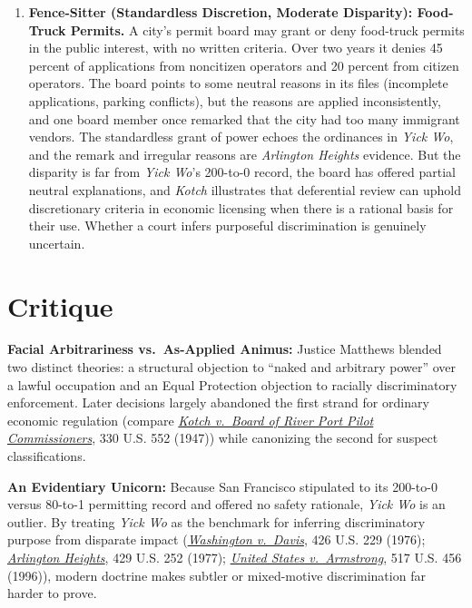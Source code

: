 \documentclass[12pt]{article}
\begin{document}
\begin{enumerate}
\item \textbf{Fence-Sitter (Standardless Discretion, Moderate Disparity): Food-Truck Permits.} A city's permit board may grant or deny food-truck permits in the public interest, with no written criteria. Over two years it denies 45 percent of applications from noncitizen operators and 20 percent from citizen operators. The board points to some neutral reasons in its files (incomplete applications, parking conflicts), but the reasons are applied inconsistently, and one board member once remarked that the city had too many immigrant vendors. The standardless grant of power echoes the ordinances in \textit{Yick Wo}, and the remark and irregular reasons are \textit{Arlington Heights} evidence. But the disparity is far from \textit{Yick Wo}'s 200-to-0 record, the board has offered partial neutral explanations, and \textit{Kotch} illustrates that deferential review can uphold discretionary criteria in economic licensing when there is a rational basis for their use. Whether a court infers purposeful discrimination is genuinely uncertain.

\end{enumerate}

\section{Critique}
\textbf{Facial Arbitrariness vs.\ As-Applied Animus:} Justice Matthews blended two distinct theories: a structural objection to ``naked and arbitrary power'' over a lawful occupation and an Equal Protection objection to racially discriminatory enforcement. Later decisions largely abandoned the first strand for ordinary economic regulation (compare \href{https://supreme.justia.com/cases/federal/us/330/552/}{\emph{Kotch v.\ Board of River Port Pilot Commissioners}}, 330 U.S. 552 (1947)) while canonizing the second for suspect classifications.

\textbf{An Evidentiary Unicorn:} Because San Francisco stipulated to its 200-to-0 versus 80-to-1 permitting record and offered no safety rationale, \emph{Yick Wo} is an outlier. By treating \emph{Yick Wo} as the benchmark for inferring discriminatory purpose from disparate impact (\href{https://supreme.justia.com/cases/federal/us/426/229/}{\emph{Washington v.\ Davis}}, 426 U.S. 229 (1976); \href{https://supreme.justia.com/cases/federal/us/429/252/}{\emph{Arlington Heights}}, 429 U.S. 252 (1977); \href{https://supreme.justia.com/cases/federal/us/517/456/}{\emph{United States v.\ Armstrong}}, 517 U.S. 456 (1996)), modern doctrine makes subtler or mixed-motive discrimination far harder to prove.
\end{document}
